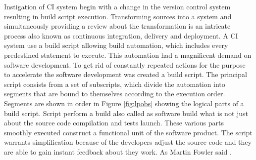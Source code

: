 Instigation of CI system begin with a change in the version control system resulting in build script execution. Transforming sources into a system and simultaneously providing a review about the transformation is an intricate process also known as continuous integration, delivery and deployment. A CI system use a build script allowing build automation, which includes every predestined statement to execute. This automation had a magnificent demand on software development. To get rid of constantly repeated actions for the purpose to accelerate the software development was created a build script. The principal script consists from a set of subscripts, which divide the automation into segments that are bound to themselves according to the execution order. Segments are shown in order in Figure \ref{fig:lpobs} showing the logical parts of a build script. Script perform a build also called as software build what is not just about the source code compilation and tests launch. These various parts smoothly executed construct a functional unit of the software product. The script warrants simplification because of the developers adjust the source code and they are able to gain instant feedback about they work. As Martin Fowler said \cite{CIMF}.

